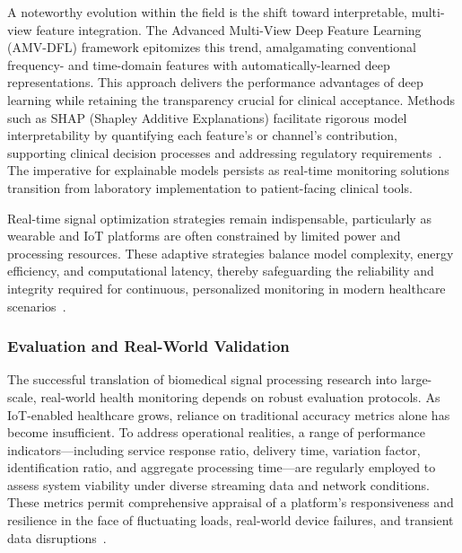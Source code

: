 \documentclass[sigconf]{acmart}
\begin{document}
A noteworthy evolution within the field is the shift toward interpretable, multi-view feature integration. The Advanced Multi-View Deep Feature Learning (AMV-DFL) framework epitomizes this trend, amalgamating conventional frequency- and time-domain features with automatically-learned deep representations. This approach delivers the performance advantages of deep learning while retaining the transparency crucial for clinical acceptance. Methods such as SHAP (Shapley Additive Explanations) facilitate rigorous model interpretability by quantifying each feature's or channel's contribution, supporting clinical decision processes and addressing regulatory requirements~\cite{ref98,ref107}. The imperative for explainable models persists as real-time monitoring solutions transition from laboratory implementation to patient-facing clinical tools.

Real-time signal optimization strategies remain indispensable, particularly as wearable and IoT platforms are often constrained by limited power and processing resources. These adaptive strategies balance model complexity, energy efficiency, and computational latency, thereby safeguarding the reliability and integrity required for continuous, personalized monitoring in modern healthcare scenarios~\cite{ref107}.

\subsubsection{Evaluation and Real-World Validation}

The successful translation of biomedical signal processing research into large-scale, real-world health monitoring depends on robust evaluation protocols. As IoT-enabled healthcare grows, reliance on traditional accuracy metrics alone has become insufficient. To address operational realities, a range of performance indicators—including service response ratio, delivery time, variation factor, identification ratio, and aggregate processing time—are regularly employed to assess system viability under diverse streaming data and network conditions. These metrics permit comprehensive appraisal of a platform’s responsiveness and resilience in the face of fluctuating loads, real-world device failures, and transient data disruptions~\cite{ref106}.
\end{document}
